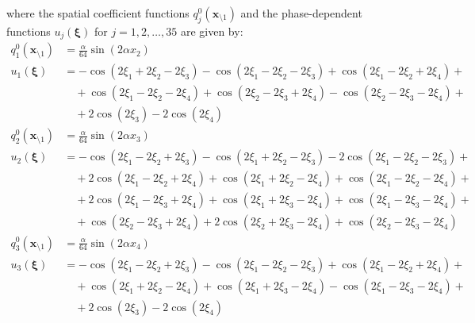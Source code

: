 \documentclass[11pt]{jfm}
\numberwithin{equation}{section}
\begin{document}
where the spatial coefficient functions \( q_j^0\left(\boldsymbol{x}_{\setminus 1}\right) \) and the phase-dependent functions \(u_j\left(\boldsymbol{\xi}\right)\) for $j=1,2,\ldots,35$ are given by:
\begin{subequations}
\label{A4}
\begin{align}
q_1^0(\boldsymbol{x}_{\setminus 1}) &= \frac{\alpha}{64} \sin(2\alpha x_2) \label{A4a} \\
u_1(\boldsymbol{\xi}) &= -\cos(2\xi_1 + 2\xi_2 - 2\xi_3) - \cos(2\xi_1 - 2\xi_2 - 2\xi_3) + \cos(2\xi_1 - 2\xi_2 + 2\xi_4)+ \nonumber\\
&\quad + \cos(2\xi_1 - 2\xi_2 - 2\xi_4) + \cos(2\xi_2 - 2\xi_3 + 2\xi_4) - \cos(2\xi_2 - 2\xi_3 - 2\xi_4)+ \nonumber\\
&\quad + 2\cos(2\xi_3) - 2\cos(2\xi_4) \label{A4b}
\end{align}\end{subequations}
\vspace{-0.4cm}
\begin{subequations}
\label{A5}
\begin{align}
q_2^0(\boldsymbol{x}_{\setminus 1})&=\frac{\alpha}{64}   \sin (2 \alpha  x_3) \label{A5a} \\
u_2(\boldsymbol{\xi})&=-\cos (2 \xi_1-2 \xi_2+2 \xi_3)-\cos (2 \xi_1+2 \xi_2-2 \xi_3)-2 \cos (2 \xi_1-2 \xi_2-2 \xi_3)+ \nonumber\\
&\quad+2 \cos (2 \xi_1-2 \xi_2+2 \xi_4)+\cos (2 \xi_1+2 \xi_2-2 \xi_4)+\cos (2 \xi_1-2 \xi_2-2 \xi_4)+ \nonumber\\
&\quad+2 \cos (2 \xi_1-2 \xi_3+2 \xi_4)+\cos (2 \xi_1+2 \xi_3-2 \xi_4)+\cos (2 \xi_1-2 \xi_3-2 \xi_4)+ \nonumber\\
&\quad+\cos (2 \xi_2-2 \xi_3+2 \xi_4)+2 \cos (2 \xi_2+2 \xi_3-2 \xi_4)+\cos (2 \xi_2-2 \xi_3-2 \xi_4)\label{A5b}
\end{align}\end{subequations}
\vspace{-0.4cm}
\begin{subequations}
\label{A6}
\begin{align}
q_3^0(\boldsymbol{x}_{\setminus 1})&=\frac{\alpha}{64}   \sin (2 \alpha  x_4)\label{A6a} \\
u_3(\boldsymbol{\xi})&=-\cos (2 \xi_1-2 \xi_2+2 \xi_3)-\cos (2 \xi_1-2 \xi_2-2 \xi_3)+\cos (2 \xi_1-2 \xi_2+2 \xi_4)+ \nonumber\\
&\quad+\cos (2 \xi_1+2 \xi_2-2 \xi_4)+\cos (2 \xi_1+2 \xi_3-2 \xi_4)-\cos (2 \xi_1-2 \xi_3-2 \xi_4)+ \nonumber\\
&\quad+2 \cos (2 \xi_3)-2 \cos (2 \xi_4)\label{A6b}
\end{align}\end{subequations}
\end{document}

